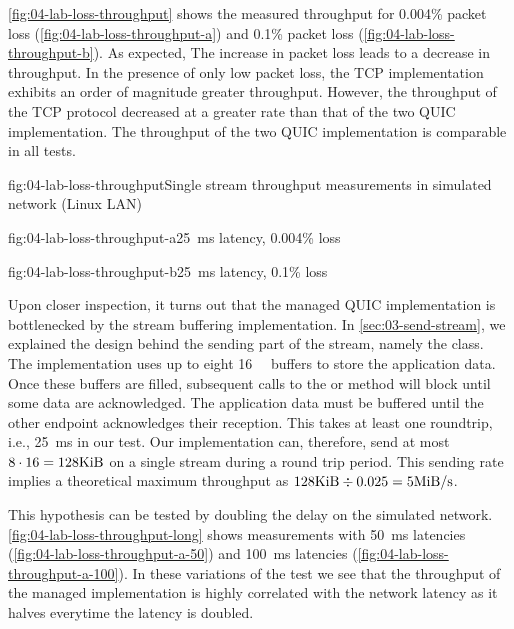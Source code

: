 \autoref{fig:04-lab-loss-throughput} shows the measured throughput for 0.004\% packet loss
(\autoref{fig:04-lab-loss-throughput-a}) and 0.1\% packet loss
(\autoref{fig:04-lab-loss-throughput-b}). As expected, The increase in packet loss leads to a
decrease in throughput. In the presence of only low packet loss, the TCP implementation exhibits an
order of magnitude greater throughput. However, the throughput of the TCP protocol decreased at a
greater rate than that of the two QUIC implementation. The throughput of the two QUIC implementation
is comparable in all tests.

\begin{myFigure}{fig:04-lab-loss-throughput}{Single stream throughput measurements in simulated network (Linux LAN)}
\begin{mySubfigure}{0.49\linewidth}{fig:04-lab-loss-throughput-a}{\SI{25}{\milli\second} latency, 0.004\% loss}
\footnotesize

\end{mySubfigure}
\begin{mySubfigure}{0.49\linewidth}{fig:04-lab-loss-throughput-b}{\SI{25}{\milli\second} latency, 0.1\% loss}
\footnotesize

\end{mySubfigure}
\end{myFigure}

Upon closer inspection, it turns out that the managed QUIC implementation is bottlenecked by the
stream buffering implementation. In \autoref{sec:03-send-stream}, we explained the design behind the
sending part of the stream, namely the \SendStream{} class. The implementation uses up to eight
\SI{16}{\kibi\byte} buffers to store the application data. Once these buffers are filled, subsequent
calls to the  or  method will block until some data are
acknowledged. The application data must be buffered until the other endpoint acknowledges their
reception. This takes at least one roundtrip, i.e., \SI{25}{\milli\second} in our test. Our
implementation can, therefore, send at most $8 \cdot 16 = 128 \si{\kibi\byte}$ on a single stream during
a round trip period. This sending rate implies a theoretical maximum throughput as
$128\si{\kibi\byte} \div 0.025 = 5 \si[per-mode=symbol]{\mebi\byte\per\second}$.

This hypothesis can be tested by doubling the delay on the simulated network.
\autoref{fig:04-lab-loss-throughput-long} shows measurements with \SI{50}{\milli\second} latencies
(\autoref{fig:04-lab-loss-throughput-a-50}) and \SI{100}{\milli\second} latencies
(\autoref{fig:04-lab-loss-throughput-a-100}). In these variations of the test we see that the
throughput of the managed implementation is highly correlated with the network latency as it halves
everytime the latency is doubled.

